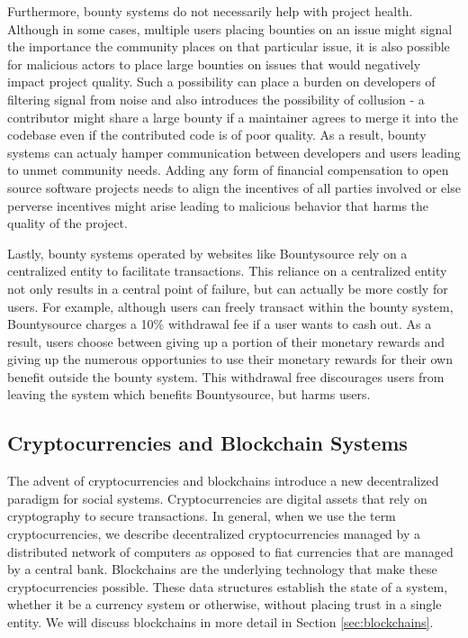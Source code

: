 Furthermore, bounty systems do not necessarily help with
project health. Although in some cases, multiple users placing bounties on an
issue might signal the importance the community places on that particular issue,
it is also possible for malicious actors to place large bounties on issues that
would negatively impact project quality. Such a possibility can place a burden
on developers of filtering signal from noise and also introduces the possibility
of collusion - a contributor might share a large bounty if a maintainer agrees
to merge it into the codebase even if the contributed code is of poor quality.
As a result, bounty systems can actualy hamper communication
between developers and users leading to unmet community needs. Adding any form of financial compensation to open source
software projects needs to align the incentives of all parties
involved or else perverse incentives might arise leading to malicious behavior
that harms the quality of the project.

Lastly, bounty systems operated by websites like Bountysource rely on a
centralized entity to facilitate transactions. This reliance on a centralized
entity not only results in a central point of failure, but can actually be more
costly for users. For example, although users can freely transact within the bounty system, Bountysource
charges a 10\% withdrawal fee if a user wants to cash out. As a result, users
choose between giving up a portion of their monetary rewards and giving up the numerous
opportunies to use their monetary rewards for their own benefit outside the bounty system. This withdrawal free
discourages users from leaving the system which benefits Bountysource, but harms users.

\subsection{Cryptocurrencies and Blockchain Systems}

The advent of cryptocurrencies and blockchains introduce a new decentralized
paradigm for social systems. Cryptocurrencies are digital assets that rely on
cryptography to secure transactions. In general, when we use the term
cryptocurrencies, we describe decentralized
cryptocurrencies managed by a distributed network of computers as opposed to
fiat currencies that are managed by a central bank. Blockchains are the
underlying technology that make these cryptocurrencies possible. These data
structures establish the state of a system, whether it be a currency system or
otherwise, without placing trust in a single entity. We will discuss blockchains
in more detail in Section \ref{sec:blockchains}.

